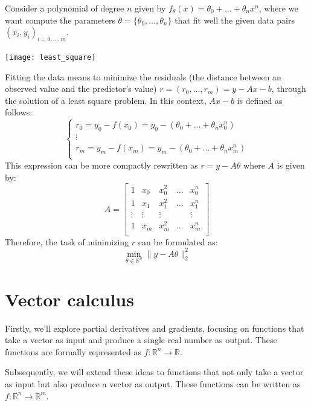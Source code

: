 \documentclass{article}
\begin{document}
\begin{example}
    Consider a polynomial of degree $n$ given by
    $f_\theta(x)=\theta_0+\ldots+\theta_nx^n$, where we want compute the
    parameters $\theta=\{\theta_0,\ldots,\theta_n\}$ that fit well the given
    data pairs $(x_i,y_i)_{i=0,\ldots,m}$.
    \begin{center}
        \texttt{[image: least\_square]}
    \end{center}
    Fitting the data means to minimize the residuals (the distance between an
    observed value and the predictor's value) $r=(r_0,\ldots,r_m)=y-Ax-b$,
    through the solution of a least square problem. In this context, $Ax-b$ is
    defined as follows:
    $$
    \begin{cases}
        r_0=y_0-f(x_0)=y_0-(\theta_0+\ldots+\theta_nx_0^n)\\
        \vdots \\ 
        r_m=y_m-f(x_m)=y_m-(\theta_0+\ldots+\theta_nx_m^n)\\
    \end{cases}
    $$
    This expression can be more compactly rewritten as $r=y-A\theta$ where $A$
    is given by:
    $$A=\begin{bmatrix}
        1 & x_0 & x_0^2 & \ldots & x_0^n \\
        1 & x_1 & x_1^2 & \ldots & x_1^n \\
        \vdots & \vdots & \vdots & & \vdots \\
        1 & x_m & x_m^2 & \ldots & x_m^n \\
    \end{bmatrix}$$
    Therefore, the task of minimizing $r$ can be formulated as:
    $$\min_{\theta\in\mathbb{R}^n}\lVert y-A\theta\rVert_2^2$$
\end{example}
\cleardoublepage
\section{Vector calculus}
Firstly, we'll explore partial derivatives and gradients, focusing on functions that take a vector as input and produce a
single real number as output. These functions are formally represented as
$f:\mathbb{R}^n\to \mathbb{R}$.

Subsequently, we will extend these ideas to functions that not only take a
vector as input but also produce a vector as output. These functions can be
written as $f:\mathbb{R}^n\to \mathbb{R}^m$.
\end{document}
